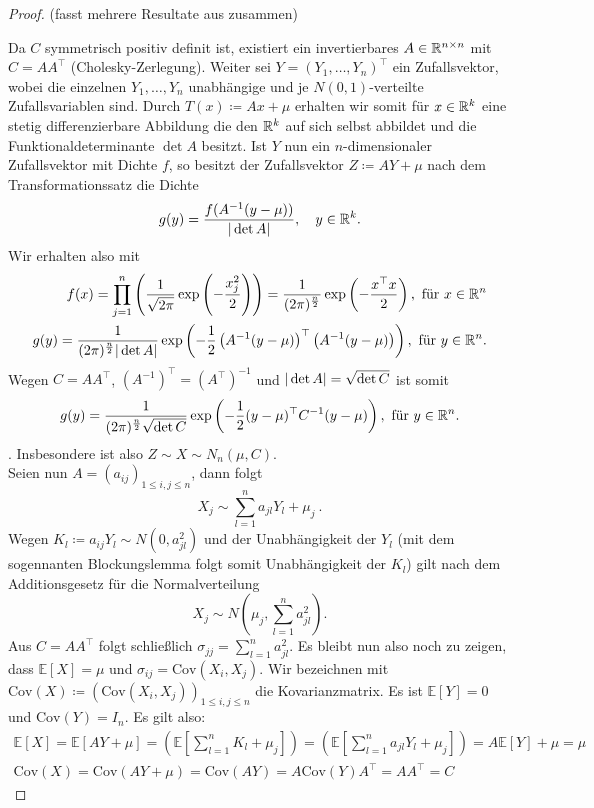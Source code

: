 \begin{proof}(fasst mehrere Resultate aus \cite{brokate2016grundwissen} zusammen)
	
	Da $ C $ symmetrisch positiv definit ist, existiert ein invertierbares $ A \in \mathbb{R}^{n \times n} $ mit $ C = AA^{\top} $ (Cholesky-Zerlegung).
	Weiter sei $ Y = (Y_1,\dots,Y_n)^{\top} $ ein Zufallsvektor, wobei die einzelnen $ Y_1,\dots,Y_n $ unabhängige und je $ N(0,1) $-verteilte Zufallsvariablen sind. 
	Durch $ T(x) \coloneqq Ax + \mu $ erhalten wir somit für $ x \in \mathbb{R}^k $ eine stetig differenzierbare Abbildung die den $ \mathbb{R}^k $ auf sich selbst abbildet und die Funktionaldeterminante $ \det A$ besitzt.
	Ist $ Y $ nun ein $ n $-dimensionaler Zufallsvektor mit Dichte $ f $, so besitzt der Zufallsvektor $ Z \coloneqq  AY + \mu$ nach dem Transformationssatz die Dichte
	\[
		g(y) = \frac{f(A^{-1}(y-\mu))}{| \det A |}, \quad y \in \mathbb{R}^k .
	\]
	Wir erhalten also mit 
	\begin{align*}
		f(x) = \prod_{j=1}^n \left( \frac{1}{\sqrt{2\pi}}\exp\left(-\frac{x_j^2}{2}\right) \right) = \frac{1}{(2\pi)^{\frac{n}{2}}} \exp \left( - \frac{x^{\top}x}{2}\right), \text{ für } x \in \mathbb{R}^n \\
		g(y) = \frac{1}{(2\pi)^{\frac{n}{2}}| \det A |} \exp \left( - \frac{1}{2} \left( A^{-1}(y-\mu)\right)^{\top}\left( A^{-1}(y-\mu)\right)\right), \text{ für }y \in \mathbb{R}^n .
	\end{align*}
	Wegen $ C = A A^{\top} $, $ (A^{-1})^{\top} = (A^{\top})^{-1} $ und $ | \det A | = \sqrt{\det C} $ ist somit 
	\[
		g(y) = \frac{1}{(2\pi)^{\frac{n}{2}}\sqrt{\det C}} \exp \left( - \frac{1}{2} (y-\mu)^{\top}C^{-1} (y-\mu)\right), \text{ für }y \in \mathbb{R}^n.
	\].
	Insbesondere ist also $ Z \sim X \sim N_n(\mu,C) $.\\
	Seien nun $ A = (a_{ij})_{1 \leq i,j \leq n} $, dann folgt
	\[
		X_j \sim \sum_{l=1}^n a_{jl} Y_l + \mu_j \ .
	\]
	Wegen $ K_l \coloneqq a_{ij} Y_l  \sim N(0,a_{jl}^2) $ und der Unabhängigkeit der $ Y_l $ (mit dem sogennanten Blockungslemma folgt somit Unabhängigkeit der $ K_l $) gilt nach dem Additionsgesetz für die Normalverteilung 
	\[
		X_j\sim N \left( \mu_j,\sum_{l=1}^{n}a_{jl}^2 \right).
	\]
	Aus $ C = A A^{\top}  $ folgt schließlich $ \sigma_{jj} = \sum_{l=1}^{n} a_{jl}^2 $.
	Es bleibt nun also noch zu zeigen, dass $ \mathbb{E}[X] = \mu $ und $ \sigma_{ij} = \text{Cov}(X_i,X_j) $.
	Wir bezeichnen mit $ \text{Cov}(X) \coloneqq (\text{Cov}(X_i,X_j))_{1 \leq i,j \leq n} $
	die Kovarianzmatrix.
	Es ist $ \mathbb{E}[Y] = 0 $ und  $\text{Cov}(Y) = I_n $.
	Es gilt also:
	\begin{align*}
		\mathbb{E}[X] = \mathbb{E}[AY + \mu] = (\mathbb{E}[\sum_{l=1}^{n}K_l+\mu_j]) =(\mathbb{E}[\sum_{l=1}^{n}a_{jl}Y_l+\mu_j])= A \mathbb{E}[Y] + \mu = \mu \\
		\text{Cov}(X) = \text{Cov}(AY + \mu) =  \text{Cov}(AY) = A \text{Cov}(Y) A^{\top} = AA^{\top} = C
	\end{align*}	
	
\end{proof}
